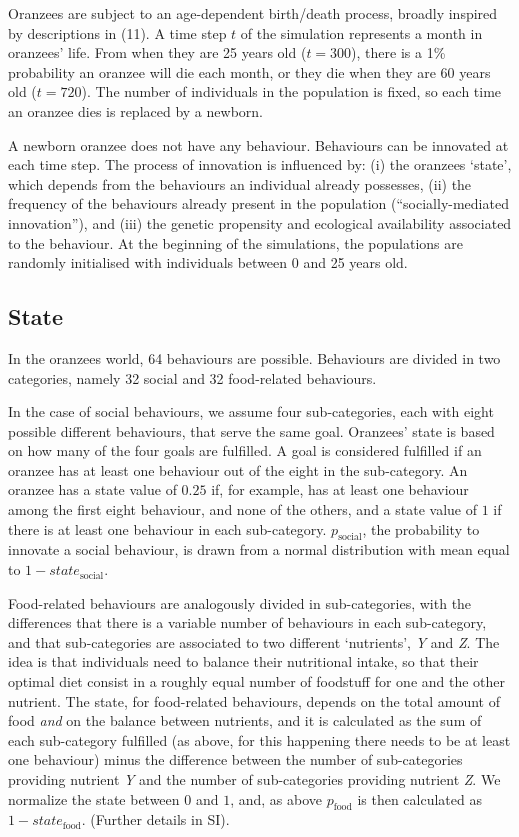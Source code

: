\documentclass[9pt,twocolumn,twoside,]{pnas-new}
\begin{document}
Oranzees are subject to an age-dependent birth/death process, broadly
inspired by descriptions in (11). A time step \(t\) of the simulation
represents a month in oranzees' life. From when they are 25 years old
(\(t=300\)), there is a 1\% probability an oranzee will die each month,
or they die when they are 60 years old (\(t=720\)). The number of
individuals in the population is fixed, so each time an oranzee dies is
replaced by a newborn.

A newborn oranzee does not have any behaviour. Behaviours can be
innovated at each time step. The process of innovation is influenced by:
(i) the oranzees `state', which depends from the behaviours an
individual already possesses, (ii) the frequency of the behaviours
already present in the population (``socially-mediated innovation''),
and (iii) the genetic propensity and ecological availability associated
to the behaviour. At the beginning of the simulations, the populations
are randomly initialised with individuals between 0 and 25 years old.

\subsection*{State}\label{format}

In the oranzees world, 64 behaviours are possible. Behaviours are
divided in two categories, namely 32 social and 32 food-related
behaviours.

In the case of social behaviours, we assume four sub-categories, each
with eight possible different behaviours, that serve the same goal.
Oranzees' state is based on how many of the four goals are fulfilled. A
goal is considered fulfilled if an oranzee has at least one behaviour
out of the eight in the sub-category. An oranzee has a state value of
\(0.25\) if, for example, has at least one behaviour among the first
eight behaviour, and none of the others, and a state value of \(1\) if
there is at least one behaviour in each sub-category.
\(p_\text{social}\), the probability to innovate a social behaviour, is
drawn from a normal distribution with mean equal to
\(1-state_\text{social}\).

Food-related behaviours are analogously divided in sub-categories, with
the differences that there is a variable number of behaviours in each
sub-category, and that sub-categories are associated to two different
`nutrients', \emph{Y} and \emph{Z}. The idea is that individuals need to
balance their nutritional intake, so that their optimal diet consist in
a roughly equal number of foodstuff for one and the other nutrient. The
state, for food-related behaviours, depends on the total amount of food
\emph{and} on the balance between nutrients, and it is calculated as the
sum of each sub-category fulfilled (as above, for this happening there
needs to be at least one behaviour) minus the difference between the
number of sub-categories providing nutrient \emph{Y} and the number of
sub-categories providing nutrient \emph{Z}. We normalize the state
between \(0\) and \(1\), and, as above \(p_\text{food}\) is then
calculated as \(1-state_\text{food}\). (Further details in SI).
\end{document}
